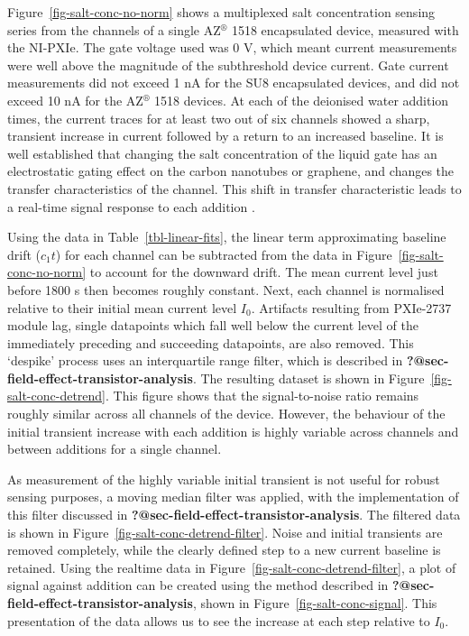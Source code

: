\documentclass[
  a4paper,
]{scrbook}
\begin{document}
Figure~\ref{fig-salt-conc-no-norm} shows a multiplexed salt
concentration sensing series from the channels of a single
AZ\(^\circledR\) 1518 encapsulated device, measured with the NI-PXIe.
The gate voltage used was 0 V, which meant current measurements were
well above the magnitude of the subthreshold device current. Gate
current measurements did not exceed 1 nA for the SU8 encapsulated
devices, and did not exceed 10 nA for the AZ\(^\circledR\) 1518 devices.
At each of the deionised water addition times, the current traces for at
least two out of six channels showed a sharp, transient increase in
current followed by a return to an increased baseline. It is well
established that changing the salt concentration of the liquid gate has
an electrostatic gating effect on the carbon nanotubes or graphene, and
changes the transfer characteristics of the channel. This shift in
transfer characteristic leads to a real-time signal response to each
addition \autocite{Heller2009,Heller2010,Kireev2017}.

Using the data in Table~\ref{tbl-linear-fits}, the linear term
approximating baseline drift (\(c_1t\)) for each channel can be
subtracted from the data in Figure~\ref{fig-salt-conc-no-norm} to
account for the downward drift. The mean current level just before 1800
s then becomes roughly constant. Next, each channel is normalised
relative to their initial mean current level \(I_{0}\). Artifacts
resulting from PXIe-2737 module lag, single datapoints which fall well
below the current level of the immediately preceding and succeeding
datapoints, are also removed. This `despike' process uses an
interquartile range filter, which is described in
\textbf{?@sec-field-effect-transistor-analysis}. The resulting dataset
is shown in Figure~\ref{fig-salt-conc-detrend}. This figure shows that
the signal-to-noise ratio remains roughly similar across all channels of
the device. However, the behaviour of the initial transient increase
with each addition is highly variable across channels and between
additions for a single channel.

As measurement of the highly variable initial transient is not useful
for robust sensing purposes, a moving median filter was applied, with
the implementation of this filter discussed in
\textbf{?@sec-field-effect-transistor-analysis}. The filtered data is
shown in Figure~\ref{fig-salt-conc-detrend-filter}. Noise and initial
transients are removed completely, while the clearly defined step to a
new current baseline is retained. Using the realtime data in
Figure~\ref{fig-salt-conc-detrend-filter}, a plot of signal against
addition can be created using the method described in
\textbf{?@sec-field-effect-transistor-analysis}, shown in
Figure~\ref{fig-salt-conc-signal}. This presentation of the data allows
us to see the increase at each step relative to \(I_{0}\).
\end{document}
